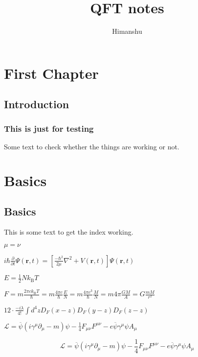 \documentclass[11pt,a4paper]{book}
\author{Himanshu}
\title{QFT notes}
\begin{document}
\maketitle
\tableofcontents
	
    
\chapter{First Chapter}
\section{Introduction}
	
	
\subsection{This is just for testing}
	
Some text to check whether the things are working or not.
	
\chapter{Basics}
\section{Basics}
This is some text to get the index working.

$\mu = \nu$
	
$	i\hbar {\frac {\partial }{\partial t}}\Psi (\mathbf {r} ,t)=\left[{\frac {-\hbar ^{2}}{2\mu }}\nabla ^{2}+V(\mathbf {r} ,t)\right]\Psi (\mathbf {r} ,t)$

$E = \frac { 1 } { 2 } N k _ { \mathrm { B } } T$

$F = m \frac { 2 \pi c k _ { \mathrm { B } } T } { \hbar } = m \frac { 4 \pi c } { \hbar } \frac { E } { N } = m \frac { 4 \pi c ^ { 3 } } { \hbar } \frac { M } { N } = m 4 \pi \frac { G M } { A } = G \frac { m M } { r ^ { 2 } }$

$12 \cdot \frac { - i \lambda } { 4 ! } \int d ^ { 4 } z D _ { F } ( x - z ) D _ { F } ( y - z ) D _ { F } ( z - z )$


$\mathcal { L } = \overline { \psi } \left( i \gamma ^ { \mu } \partial _ { \mu } - m \right) \psi - \frac { 1 } { 4 } F _ { \mu \nu } F ^ { \mu \nu } - e \overline { \psi } \gamma ^ { \mu } \psi A _ { \mu }$


\begin{equation}
    \mathcal { L } = \overline { \psi } \left( i \gamma ^ { \mu } \partial _ { \mu } - m \right) \psi - \frac { 1 } { 4 } F _ { \mu \nu } F ^ { \mu \nu } - e \overline { \psi } \gamma ^ { \mu } \psi A _ { \mu }
\end{equation}
\end{document}

